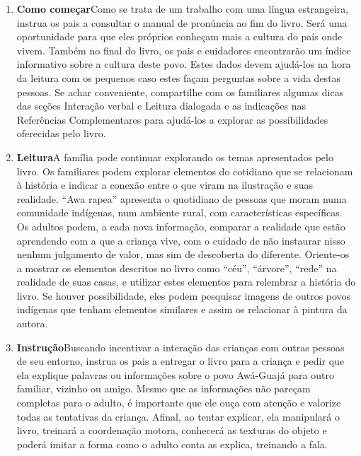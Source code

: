 \documentclass[11pt]{extarticle}
\begin{document}
\begin{enumerate}
\item \textbf{Como começar}\quad Como se trata de um trabalho com
uma língua estrangeira, instrua os pais a consultar o manual de 
pronúncia ao fim do livro. Será uma oportunidade para que eles
próprios conheçam mais a cultura do país onde vivem. Também no final do livro,
os pais e cuidadores encontrarão um índice informativo sobre a cultura deste povo.
Estes dados devem ajudá-los na hora da leitura com os pequenos caso estes 
façam perguntas sobre a vida destas pessoas. Se achar conveniente, compartilhe com 
os familiares algumas dicas das seções Interação verbal 
e Leitura dialogada e as indicações nas Referências Complementares 
para ajudá-los a explorar as possibilidades oferecidas pelo livro. 

\item \textbf{Leitura}\quad A família pode continuar 
explorando os temas apresentados pelo livro. Os familiares podem explorar 
elementos do cotidiano que se relacionam à história e indicar a conexão 
entre o que viram na ilustração e suas realidade. ``Awa rapea'' apresenta 
o quotidiano de pessoas que moram numa comunidade indígenas, num ambiente rural,
com características específicas. Os adultos podem, a cada nova informação, comparar
a realidade que estão aprendendo com a que a criança vive, com o cuidado
de não instaurar nisso nenhum julgamento de valor, mas sim de descoberta
do diferente. Oriente-os a mostrar os elementos descritos no livro como ``céu'',
``árvore'', ``rede'' na realidade de suas casas, e utilizar estes elementos para 
relembrar a história do livro. Se houver possibilidade, eles podem pesquisar 
imagens de outros povos indígenas que tenham elementos similares e assim os relacionar à pintura da autora. 

\item \textbf{Instrução}\quad Buscando incentivar a interação das crianças
com outras pessoas de seu entorno, instrua os pais a entregar o livro para a criança 
e pedir que ela explique palavras ou informações sobre o povo Awá-Guajá para outro familiar, vizinho ou amigo. 
Mesmo que as informações não pareçam 
completas para o adulto, é importante que ele ouça com atenção e 
valorize todas as tentativas da criança. Afinal, ao tentar explicar, 
ela manipulará o livro, treinará a coordenação motora, conhecerá as texturas 
do objeto e poderá imitar a forma como o adulto 
conta as explica, treinando a fala. 
\end{enumerate}
\end{document}
